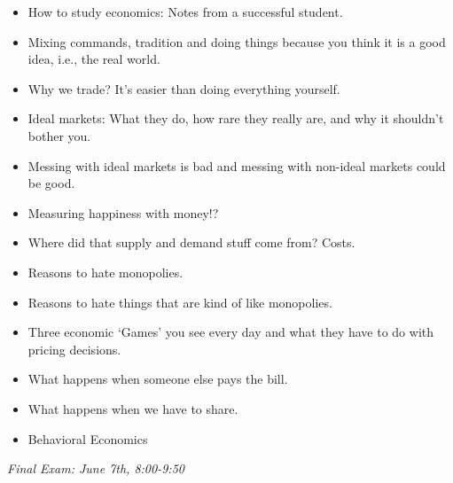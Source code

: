\documentclass[letterpaper,10pt]{article}
\newcommand{\ExamOne}{Final Exam:  June 7th, 8:00-9:50}
\begin{document}
\begin{itemize}
\item How to study economics: Notes from a successful student.
\item Mixing commands, tradition and doing things because you think it
  is a good idea, i.e., the real world. 
\item Why we trade?  It's easier than doing everything yourself.
\item Ideal markets: What they do, how rare they really are, and why
  it shouldn't bother you.
\item Messing with ideal markets is bad and messing with non-ideal
  markets could be good.
\item Measuring happiness with money!?
\item Where did that supply and demand stuff come from?  Costs.
\item Reasons to hate monopolies.
\item Reasons to hate things that are kind of like monopolies.
\item Three economic `Games' you see every day and what they have to
  do with pricing decisions.
\item What happens when someone else pays the bill.
\item What happens when we have to share.
\item Behavioral Economics
\end{itemize}

\medskip

\centering

\emph{\ExamOne}
\end{document}
